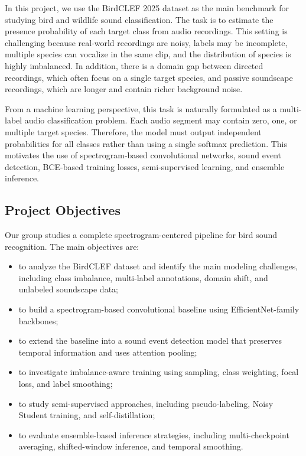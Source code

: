 \documentclass[a4paper,12pt]{article}
\begin{document}
In this project, we use the BirdCLEF 2025 dataset as the main benchmark for studying bird and wildlife sound classification. The task is to estimate the presence probability of each target class from audio recordings. This setting is challenging because real-world recordings are noisy, labels may be incomplete, multiple species can vocalize in the same clip, and the distribution of species is highly imbalanced. In addition, there is a domain gap between directed recordings, which often focus on a single target species, and passive soundscape recordings, which are longer and contain richer background noise.

From a machine learning perspective, this task is naturally formulated as a multi-label audio classification problem. Each audio segment may contain zero, one, or multiple target species. Therefore, the model must output independent probabilities for all classes rather than using a single softmax prediction. This motivates the use of spectrogram-based convolutional networks, sound event detection, BCE-based training losses, semi-supervised learning, and ensemble inference.

\subsection{Project Objectives}
Our group studies a complete spectrogram-centered pipeline for bird sound recognition. The main objectives are:
\begin{itemize}
    \item to analyze the BirdCLEF dataset and identify the main modeling challenges, including class imbalance, multi-label annotations, domain shift, and unlabeled soundscape data;
    \item to build a spectrogram-based convolutional baseline using EfficientNet-family backbones;
    \item to extend the baseline into a sound event detection model that preserves temporal information and uses attention pooling;
    \item to investigate imbalance-aware training using sampling, class weighting, focal loss, and label smoothing;
    \item to study semi-supervised approaches, including pseudo-labeling, Noisy Student training, and self-distillation;
    \item to evaluate ensemble-based inference strategies, including multi-checkpoint averaging, shifted-window inference, and temporal smoothing.
\end{itemize}
\end{document}
